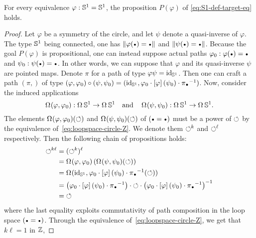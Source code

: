 \documentclass[english,a4]{article}
\renewcommand{\ap}[1]{\left[{#1}\right]}
\begin{document}
\begin{proposition}
  \label{prop:S1-eq-either}%
  For every equivalence $\varphi:{{\mathbb S^{1}}}={{\mathbb S^{1}}}$, the proposition
  $P(\varphi)$ of \cref{eq:S1-def-target-eq} holds.
\end{proposition}
\begin{proof}
  Let $\varphi$ be a symmetry of the circle, and let $\psi$ denote a
  quasi-inverse of $\varphi$. The type ${{\mathbb S^{1}}}$ being connected, one
  has $\Trunc{\varphi(\base) = \base}$ and
  $\Trunc{\psi(\base) = \base}$. Because the goal $P(\varphi)$ is
  propositional, one can instead suppose actual paths
  $\varphi_0\from \varphi(\base) = \base$ and
  $\psi_0\from \psi(\base) = \base$. In other words, we can suppose that
  $\varphi$ and its quasi-inverse $\psi$ are pointed maps. Denote
  $\pi$ for a path of type $\varphi\psi = \mathord{\mathrm{id}}_{{\mathbb S^{1}}}$. Then one can craft a
  path $(\pi,)$ of type
  $(\varphi,\varphi_0) \circ (\psi,\psi_0) =
  (\id_\Sc, \varphi_0 \cdot \ap \varphi (\psi_0) \cdot \inv {\pi_{\base}})$. Now, consider the
  induced applications
  \begin{displaymath}
    \mathop{\Omega^{}} (\varphi,\varphi_0) : \mathop{\Omega^{}} {{\mathbb S^{1}}} \to \mathop{\Omega^{}} {{\mathbb S^{1}}}
    \quad\text{and}\quad
    \mathop{\Omega^{}} (\psi,\psi_0) : \mathop{\Omega^{}} {{\mathbb S^{1}}} \to \mathop{\Omega^{}} {{\mathbb S^{1}}}.
  \end{displaymath}
  The elements $\mathop{\Omega^{}} (\varphi,\varphi_0) (\mathord{\circlearrowleft})$ and
  $\mathop{\Omega^{}} (\psi,\psi_0) (\mathord{\circlearrowleft})$ of $(\base=\base)$ must be a
  power of $\mathord{\circlearrowleft}$ by the equivalence
  of~\cref{eq:loopspace-circle-Z}. We denote them $\mathord{\circlearrowleft}^k$ and
  $\mathord{\circlearrowleft}^\ell$ respectively. Then the following chain of propositions
  holds:
  \begin{align*}
    \Sloop^{k\ell} &= (\Sloop^k)^\ell\\
    &= \loopspace{} (\varphi,\varphi_0) \left(
      \loopspace{} (\psi,\psi_0) (\Sloop)
    \right)\\
    &= \loopspace{} (\id_\Sc, 
    \varphi_0 \cdot \ap \varphi (\psi_0) \cdot \inv {\pi_{\base}} (\Sloop))
    \\
    &=
    \left( \varphi_0 \cdot \ap \varphi (\psi_0) \cdot \inv {\pi_{\base}} \right)
    \cdot \Sloop \cdot
    \inv {\left( \varphi_0 \cdot \ap \varphi (\psi_0) \cdot \inv {\pi_{\base}} \right)}
    \\
    &= \Sloop
  \end{align*}
  where the last equality exploits commutativity of path composition
  in the loop space $(\base = \base)$. Through the equivalence
  of~\cref{eq:loopspace-circle-Z}, we get that $k\ell=1$ in $\mathbb{Z}$,

\end{proof}
\end{document}
